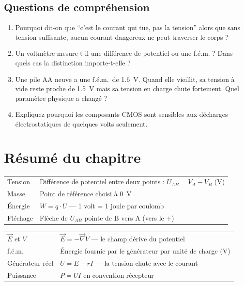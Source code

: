 \documentclass[12pt,a4paper,twoside]{book}
\begin{document}
\subsection*{Questions de compréhension}

\begin{enumerate}[nosep]
\item Pourquoi dit-on que ``c'est le courant qui tue, pas la tension'' alors que sans tension suffisante, aucun courant dangereux ne peut traverser le corps ?
\item Un voltmètre mesure-t-il une différence de potentiel ou une f.é.m. ? Dans quels cas la distinction importe-t-elle ?
\item Une pile AA neuve a une f.é.m.\ de \SI{1.6}{V}. Quand elle vieillit, sa tension à vide reste proche de \SI{1.5}{V} mais sa tension en charge chute fortement. Quel paramètre physique a changé ?
\item Expliquez pourquoi les composants CMOS sont sensibles aux décharges électrostatiques de quelques volts seulement.
\end{enumerate}

\section*{Résumé du chapitre}

\begin{bases}[title={\color{white} Résumé --- Les Bases}]
\begin{center}
\renewcommand{\arraystretch}{1.3}
\begin{tabular}{p{4cm}p{9cm}}
\toprule
Tension & Différence de potentiel entre deux points : $U_{AB} = V_A - V_B$ (V) \\
Masse & Point de référence choisi à \SI{0}{V} \\
Énergie & $W = q \cdot U$ --- 1 volt = 1 joule par coulomb \\
Fléchage & Flèche de $U_{AB}$ pointe de B vers A (vers le $+$) \\
\bottomrule
\end{tabular}
\end{center}
\end{bases}

\begin{approfondissement}[title={\color{white} Résumé --- Approfondissement}]
\begin{center}
\renewcommand{\arraystretch}{1.3}
\begin{tabular}{p{4cm}p{9cm}}
\toprule
$\vec{E}$ et $V$ & $\vec{E} = -\vec{\nabla}V$ --- le champ dérive du potentiel \\
f.é.m. & Énergie fournie par le générateur par unité de charge (V) \\
Générateur réel & $U = E - rI$ --- la tension chute avec le courant \\
Puissance & $P = UI$ en convention récepteur \\
\bottomrule
\end{tabular}
\end{center}
\end{approfondissement}
\end{document}
